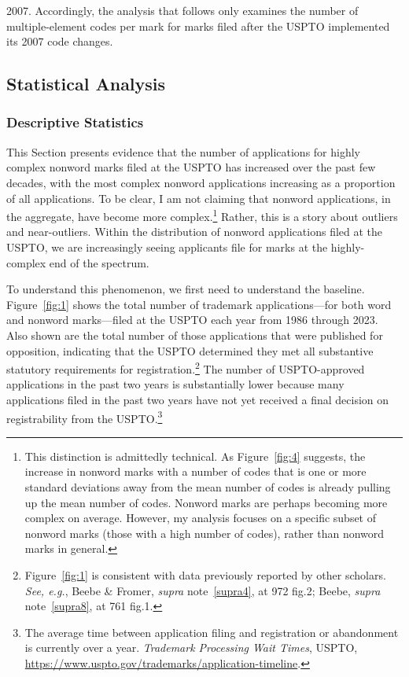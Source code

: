 \documentclass[letterpaper, 11pt, oneside]{article}
\begin{document}
2007. Accordingly, the analysis that follows only examines the number of multiple-element codes per mark for marks filed after the USPTO implemented its 2007 code changes.

\subsection{Statistical Analysis}\label{subsec:2B}

\subsubsection{Descriptive Statistics}\label{subsubsec:2B1}

\addtocounter{figure}{-4}

This Section presents evidence that the number of applications for highly complex nonword marks filed at the USPTO has increased over the past few decades, with the most complex nonword applications increasing as a proportion of all applications. To be clear, I am not claiming that nonword applications, in the aggregate, have become more complex.\footnote{This distinction is admittedly technical. As Figure~\ref{fig:4} suggests, the increase in nonword marks with a number of codes that is one or more standard deviations away from the mean number of codes is already pulling up the mean number of codes. Nonword marks are perhaps becoming more complex on average. However, my analysis focuses on a specific subset of nonword marks (those with a high number of codes), rather than nonword marks in general.} Rather, this is a story about outliers and near-outliers. Within the distribution of nonword applications filed at the USPTO, we are increasingly seeing applicants file for marks at the highly-complex end of the spectrum.

To understand this phenomenon, we first need to understand the baseline. Figure~\ref{fig:1} shows the total number of trademark applications—for both word and nonword marks—filed at the USPTO each year from 1986 through 2023. Also shown are the total number of those applications that were published for opposition, indicating that the USPTO determined they met all substantive statutory requirements for registration.\footnote{Figure~\ref{fig:1} is consistent with data previously reported by other scholars. \textit{See, e.g.}, Beebe \& Fromer, \textit{supra} note~\ref{supra4}, at 972 fig.2; Beebe, \textit{supra} note~\ref{supra8}, at 761 fig.1.} The number of USPTO-approved applications in the past two years is substantially lower because many applications filed in the past two years have not yet received a final decision on registrability from the USPTO.\footnote{The average time between application filing and registration or abandonment is currently over a year. \textit{Trademark Processing Wait Times}, USPTO, \url{https://www.uspto.gov/trademarks/application-timeline}.}
\end{document}
